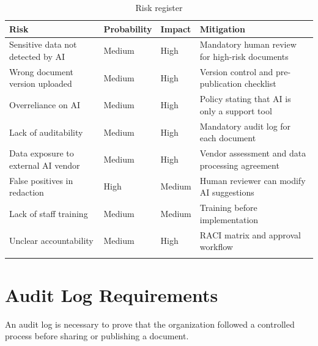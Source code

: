 \documentclass[12pt,a4paper]{article}
\begin{document}
\begin{longtable}{@{} p{4cm} >{\centering\arraybackslash}p{2cm} >{\centering\arraybackslash}p{2cm} p{5.5cm} @{}}
\toprule
\textbf{\color{accentdark}Risk} & \textbf{\color{accentdark}Probability} & \textbf{\color{accentdark}Impact} & \textbf{\color{accentdark}Mitigation} \\
\midrule
\rowcolor{accentlight!30!white}
Sensitive data not detected by AI & Medium & High & Mandatory human review for high-risk documents \\
Wrong document version uploaded & Medium & High & Version control and pre-publication checklist \\
\rowcolor{accentlight!30!white}
Overreliance on AI & Medium & High & Policy stating that AI is only a support tool \\
Lack of auditability & Medium & High & Mandatory audit log for each document \\
\rowcolor{accentlight!30!white}
Data exposure to external AI vendor & Medium & High & Vendor assessment and data processing agreement \\
False positives in redaction & High & Medium & Human reviewer can modify AI suggestions \\
\rowcolor{accentlight!30!white}
Lack of staff training & Medium & Medium & Training before implementation \\
Unclear accountability & Medium & High & RACI matrix and approval workflow \\
\bottomrule
\caption{Risk register}
\end{longtable}

\section{Audit Log Requirements}

An audit log is necessary to prove that the organization followed a controlled process before sharing or publishing a document.
\end{document}
